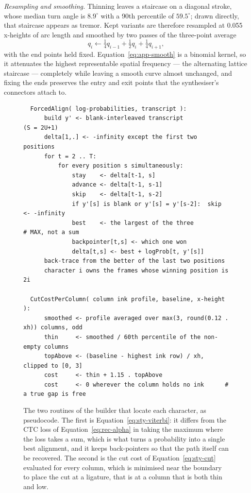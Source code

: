 \emph{Resampling and smoothing.}
Thinning leaves a staircase on a diagonal stroke, whose median turn angle is $8.9^\circ$ with a 90th percentile of $59.5^\circ$; drawn directly, that staircase appears as tremor.
Kept variants are therefore resampled at 0.055 x-heights of arc length and smoothed by two passes of the three-point average
\begin{equation}
q_i\leftarrow\tfrac14q_{i-1}+\tfrac12q_i+\tfrac14q_{i+1},
\label{eq:app-smooth}
\end{equation}
with the end points held fixed.
Equation~\ref{eq:app-smooth} is a binomial kernel, so it attenuates the highest representable spatial frequency --- the alternating lattice staircase --- completely while leaving a smooth curve almost unchanged, and fixing the ends preserves the entry and exit points that the synthesiser's connectors attach to.

\begin{figure}[!htbp]
\centering
\fontsize{8.5}{10.2}\selectfont
\begin{verbatim}
  ForcedAlign( log-probabilities, transcript ):
      build y' <- blank-interleaved transcript            (S = 2U+1)
      delta[1,.] <- -infinity except the first two positions
      for t = 2 .. T:
          for every position s simultaneously:
              stay    <- delta[t-1, s]
              advance <- delta[t-1, s-1]
              skip    <- delta[t-1, s-2]
              if y'[s] is blank or y'[s] = y'[s-2]:  skip <- -infinity
              best    <- the largest of the three          # MAX, not a sum
              backpointer[t,s] <- which one won
              delta[t,s] <- best + logProb[t, y'[s]]
      back-trace from the better of the last two positions
      character i owns the frames whose winning position is 2i

  CutCostPerColumn( column ink profile, baseline, x-height ):
      smoothed <- profile averaged over max(3, round(0.12 . xh)) columns, odd
      thin     <- smoothed / 60th percentile of the non-empty columns
      topAbove <- (baseline - highest ink row) / xh,  clipped to [0, 3]
      cost     <- thin + 1.15 . topAbove
      cost     <- 0 wherever the column holds no ink      # a true gap is free
\end{verbatim}
\caption{The two routines of the builder that locate each character, as pseudocode. The first is Equation~\ref{eq:sty-viterbi}: it differs from the CTC loss of Equation~\ref{eq:rec-alpha} in taking the maximum where the loss takes a sum, which is what turns a probability into a single best alignment, and it keeps back-pointers so that the path itself can be recovered. The second is the cut cost of Equation~\ref{eq:sty-cut} evaluated for every column, which is minimised near the boundary to place the cut at a ligature, that is at a column that is both thin and low.}
\label{fig:sty-code}
\end{figure}

